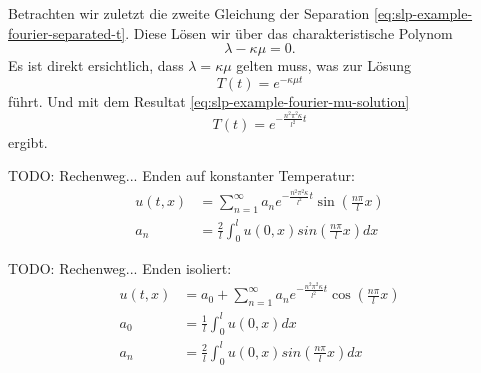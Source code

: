 

Betrachten wir zuletzt die zweite Gleichung der Separation
\eqref{eq:slp-example-fourier-separated-t}.
Diese Lösen wir über das charakteristische Polynom
\[
    \lambda - \kappa \mu
    =
    0.
\]
Es ist direkt ersichtlich, dass $\lambda = \kappa \mu$ gelten muss, was zur
Lösung
\[
    T(t)
    =
    e^{-\kappa \mu t}
\]
führt.
Und mit dem Resultat \eqref{eq:slp-example-fourier-mu-solution}
\[
    T(t)
    =
    e^{-\frac{n^{2}\pi^{2}\kappa}{l^{2}}t}
\]
ergibt.

TODO: Rechenweg... Enden auf konstanter Temperatur:
\[
\begin{aligned}
    u(t,x)
    &=
    \sum_{n=1}^{\infty}a_{n}e^{-\frac{n^{2}\pi^{2}\kappa}{l^{2}}t}
    \sin\left(\frac{n\pi}{l}x\right)
    \\
    a_{n}
    &=
    \frac{2}{l}\int_{0}^{l}u(0,x)sin\left(\frac{n\pi}{l}x\right) dx
\end{aligned}
\]

TODO: Rechenweg... Enden isoliert:
\[
\begin{aligned}
    u(t,x)
    &=
    a_{0} + \sum_{n=1}^{\infty}a_{n}e^{-\frac{n^{2}\pi^{2}\kappa}{l^{2}}t}
    \cos\left(\frac{n\pi}{l}x\right)
    \\
    a_{0}
    &=
    \frac{1}{l}\int_{0}^{l}u(0,x) dx
    \\
    a_{n}
    &=
    \frac{2}{l}\int_{0}^{l}u(0,x)sin\left(\frac{n\pi}{l}x\right) dx
\end{aligned}
\]
